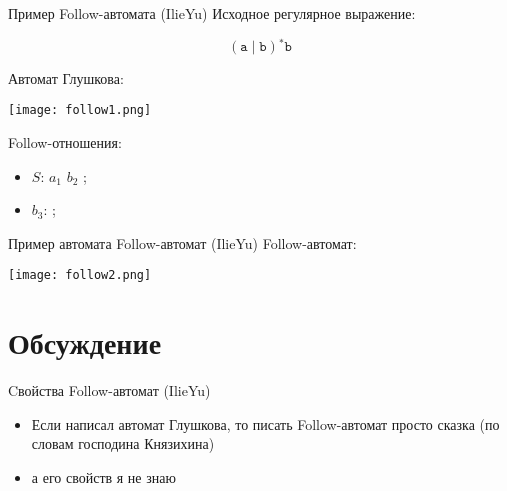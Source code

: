 \documentclass[mathserif]{beamer}
\def\alter{\ensuremath{\mathrel{\vert}}}%
\def\star{\ensuremath{^{*}}}%
\def\regexpstr#1{\mathtt{#1}}%
\begin{document}
\begin{frame}{Пример Follow-автомата (IlieYu)}
    Исходное регулярное выражение:

    \[(\regexpstr{a}\alter \regexpstr{b})\star\regexpstr{b}\]%

    Автомат Глушкова:

    \texttt{[image: follow1.png]}

    Follow-отношения:
    \begin{itemize}
        \item $S$: $a_{1}$ $b_{2}$ ;
        \item $b_{3}$: ;
    \end{itemize}

\end{frame}%

\begin{frame}{Пример автомата Follow-автомат (IlieYu)}
    Follow-автомат:

    \texttt{[image: follow2.png]}

\end{frame}%

\section{Обсуждение}
\begin{frame}{Cвойства Follow-автомат (IlieYu)}
    \begin{itemize}
        \item Если написал автомат Глушкова, то писать Follow-автомат просто сказка (по словам господина Князихина)
        \item а его свойств я не знаю
    \end{itemize}
\end{frame}
\end{document}

